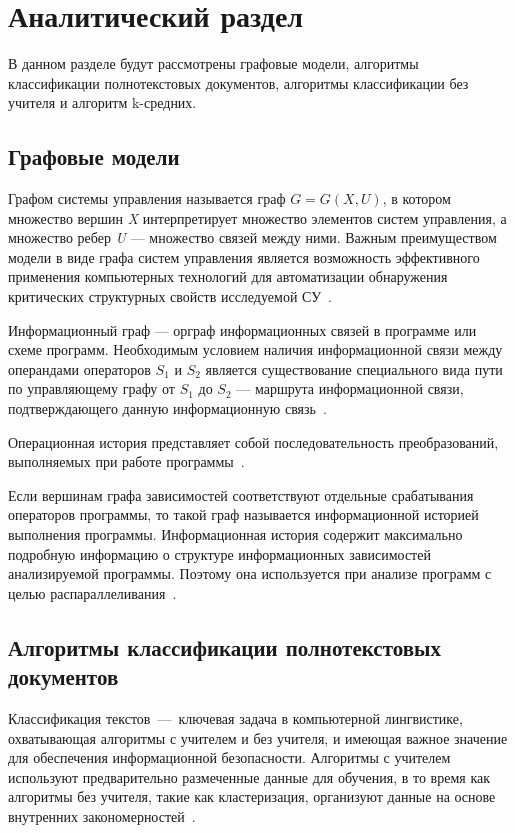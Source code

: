 \chapter{Аналитический раздел}

В данном разделе будут рассмотрены графовые модели, алгоритмы классификации полнотекстовых документов, алгоритмы классификации без учителя и алгоритм k-средних.



\section{Графовые модели}

Графом системы управления называется граф $G = G(X,U)$, в котором множество вершин \textit{X} интерпретирует множество элементов систем управления, а множество ребер \textit{U} --- множество связей между ними. Важным преимуществом модели в виде графа систем управления является возможность эффективного применения компьютерных технологий для автоматизации обнаружения критических структурных свойств исследуемой СУ~\cite{gu}.

Информационный граф --- орграф информационных связей в программе или схеме программ. Необходимым условием наличия информационной связи между операндами операторов $S_1$ и $S_2$ является существование специального вида пути по управляющему графу от $S_1$ до $S_2$ — маршрута информационной связи, подтверждающего данную информационную связь~\cite{ig}.

Операционная история представляет собой последовательность преобразований, выполняемых при работе программы~\cite{oh}.

Если вершинам графа зависимостей соответствуют отдельные срабатывания  операторов программы, то такой граф называется информационной историей выполнения программы. Информационная история содержит максимально  подробную информацию о структуре информационных зависимостей  анализируемой программы. Поэтому она используется при анализе программ с целью распараллеливания~\cite{ih}.

\section{Алгоритмы классификации полнотекстовых документов}

Классификация текстов~---~ключевая задача в компьютерной лингвистике, охватывающая алгоритмы с учителем и без учителя, и имеющая важное значение для обеспечения информационной безопасности.
Алгоритмы с учителем используют предварительно размеченные данные для обучения, в то время как алгоритмы без учителя, такие как кластеризация, организуют данные на основе внутренних закономерностей~\cite{main-book}.

